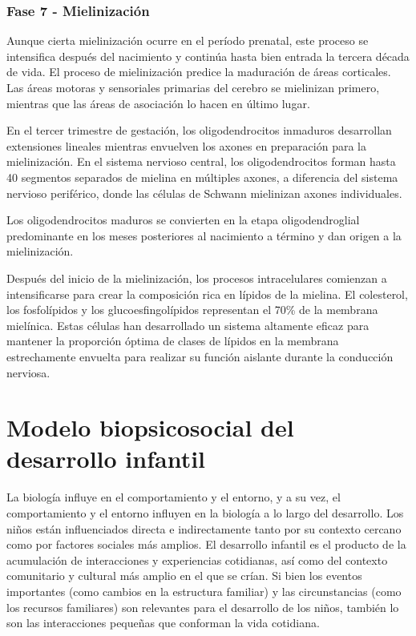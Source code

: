 \documentclass[11pt,letterpaper]{report}
\begin{document}
\subsubsection{Fase 7 - Mielinización}
Aunque cierta mielinización ocurre en el período prenatal, este proceso se
intensifica después del nacimiento y continúa hasta bien entrada la tercera
década de vida. El proceso de mielinización predice la maduración de áreas
corticales. Las áreas motoras y sensoriales primarias del cerebro se mielinizan
primero, mientras que las áreas de asociación lo hacen en último lugar.
\cite{Gibb2018}

En el tercer trimestre de gestación, los oligodendrocitos inmaduros desarrollan
extensiones lineales mientras envuelven los axones en preparación para la
mielinización. En el sistema nervioso central, los oligodendrocitos forman
hasta 40 segmentos separados de mielina en múltiples axones, a diferencia del
sistema nervioso periférico, donde las células de Schwann mielinizan axones
individuales. \cite{Polin124}

Los oligodendrocitos maduros se convierten en la etapa oligodendroglial
predominante en los meses posteriores al nacimiento a término y dan origen a la
mielinización. \cite{Polin124}

Después del inicio de la mielinización, los procesos intracelulares comienzan a
intensificarse para crear la composición rica en lípidos de la mielina. El
colesterol, los fosfolípidos y los glucoesfingolípidos representan el 70\% de
la membrana mielínica. Estas células han desarrollado un sistema altamente
eficaz para mantener la proporción óptima de clases de lípidos en la membrana
estrechamente envuelta para realizar su función aislante durante la conducción
nerviosa. \cite{Polin124}

\section{Modelo biopsicosocial del desarrollo infantil}
La biología influye en el comportamiento y el entorno, y a su vez, el
comportamiento y el entorno influyen en la biología a lo largo del desarrollo.
Los niños están influenciados directa e indirectamente tanto por su contexto
cercano como por factores sociales más amplios. El desarrollo infantil es el
producto de la acumulación de interacciones y experiencias cotidianas, así como
del contexto comunitario y cultural más amplio en el que se crían. Si bien los
eventos importantes (como cambios en la estructura familiar) y las
circunstancias (como los recursos familiares) son relevantes para el desarrollo
de los niños, también lo son las interacciones pequeñas que conforman la vida
cotidiana. \cite{Feldman3}
\end{document}

